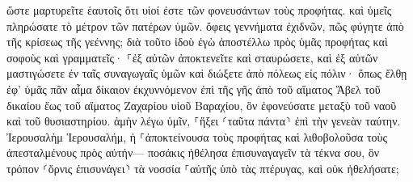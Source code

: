 \documentclass{openreader}
\begin{document}
ὥστε μαρτυρεῖτε ἑαυτοῖς ὅτι υἱοί ἐστε τῶν φονευσάντων τοὺς προφήτας. 
καὶ ὑμεῖς πληρώσατε τὸ μέτρον τῶν πατέρων ὑμῶν. 
ὄφεις γεννήματα ἐχιδνῶν, πῶς φύγητε ἀπὸ τῆς κρίσεως τῆς γεέννης; 
διὰ τοῦτο ἰδοὺ ἐγὼ ἀποστέλλω πρὸς ὑμᾶς προφήτας καὶ σοφοὺς καὶ γραμματεῖς· ⸀ἐξ αὐτῶν ἀποκτενεῖτε καὶ σταυρώσετε, καὶ ἐξ αὐτῶν μαστιγώσετε ἐν ταῖς συναγωγαῖς ὑμῶν καὶ διώξετε ἀπὸ πόλεως εἰς πόλιν· 
ὅπως ἔλθῃ ἐφ’ ὑμᾶς πᾶν αἷμα δίκαιον ἐκχυννόμενον ἐπὶ τῆς γῆς ἀπὸ τοῦ αἵματος Ἅβελ τοῦ δικαίου ἕως τοῦ αἵματος Ζαχαρίου υἱοῦ Βαραχίου, ὃν ἐφονεύσατε μεταξὺ τοῦ ναοῦ καὶ τοῦ θυσιαστηρίου. 
ἀμὴν λέγω ὑμῖν, ⸀ἥξει ⸂ταῦτα πάντα⸃ ἐπὶ τὴν γενεὰν ταύτην. 
Ἰερουσαλὴμ Ἰερουσαλήμ, ἡ ⸀ἀποκτείνουσα τοὺς προφήτας καὶ λιθοβολοῦσα τοὺς ἀπεσταλμένους πρὸς αὐτήν— ποσάκις ἠθέλησα ἐπισυναγαγεῖν τὰ τέκνα σου, ὃν τρόπον ⸂ὄρνις ἐπισυνάγει⸃ τὰ νοσσία ⸀αὐτῆς ὑπὸ τὰς πτέρυγας, καὶ οὐκ ἠθελήσατε; 
\end{document}
